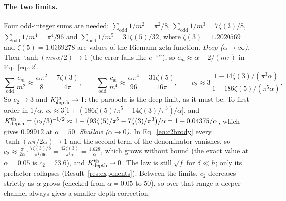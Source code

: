 \paragraph{The two limits.} Four odd-integer sums are needed:
$\sum_{\text{odd}}1/m^2=\pi^2/8$, $\sum_{\text{odd}}1/m^3=7\zeta(3)/8$,
$\sum_{\text{odd}}1/m^4=\pi^4/96$ and $\sum_{\text{odd}}1/m^5=31\zeta(5)/32$, where
$\zeta(3)=1.2020569$ and $\zeta(5)=1.0369278$ are values of the Riemann zeta function.
\emph{Deep ($\alpha\to\infty$).} Then $\tanh(m\pi\alpha/2)\to1$ (the error falls like
$e^{-\pi\alpha}$), so $c_m\approx\alpha-2/(m\pi)$ in Eq.~\eqref{eq:c2}:
\begin{equation}
\sum_{\text{odd}}\frac{c_m}{m^2}\approx\frac{\alpha\pi^2}{8}-\frac{7\zeta(3)}{4\pi},\qquad
\sum_{\text{odd}}\frac{c_m}{m^4}\approx\frac{\alpha\pi^4}{96}-\frac{31\zeta(5)}{16\pi},\qquad
c_2\approx3\,\frac{1-14\zeta(3)/(\pi^3\alpha)}{1-186\zeta(5)/(\pi^5\alpha)} .
\end{equation}
So $c_2\to3$ and $K_{\mathrm{depth}}^{\mathrm{th}}\to1$: the parabola is the deep limit, as it must be. To first order in
$1/\alpha$, $c_2\approx3\big[1+(186\zeta(5)/\pi^5-14\zeta(3)/\pi^3)/\alpha\big]$, and
$K_{\mathrm{depth}}^{\mathrm{th}}=(c_2/3)^{-1/2}\approx1-\big(93\zeta(5)/\pi^5-7\zeta(3)/\pi^3\big)/\alpha=1-0.04375/\alpha$,
which gives $0.99912$ at $\alpha=50$. \emph{Shallow ($\alpha\to0$).} In Eq.~\eqref{eq:c2brody}
every $\tanh(n\pi/2\alpha)\to1$ and the second term of the denominator vanishes, so
$c_2\approx\frac{\pi}{2\alpha}\cdot\frac{7\zeta(3)/8}{\pi^4/96}=\frac{42\zeta(3)}{\pi^3\alpha}=\frac{1.628}{\alpha}$,
which grows without bound (the exact value at $\alpha=0.05$ is $c_2=33.6$), and
$K_{\mathrm{depth}}^{\mathrm{th}}\to0$. The law is still $\sqrt f$ for $\delta\ll h$; only its prefactor collapses
(Result~\ref{res:exponents}). Between the limits, $c_2$ decreases strictly as $\alpha$ grows
(checked from $\alpha=0.05$ to $50$), so over that range a deeper channel always gives a smaller
depth correction.


